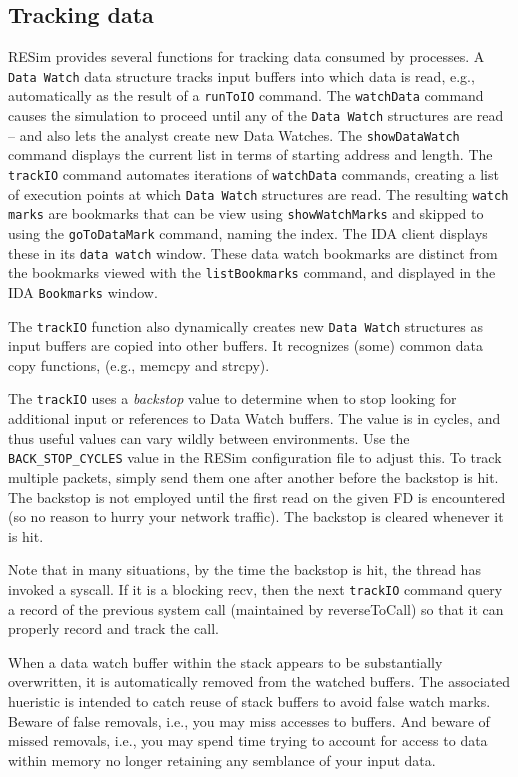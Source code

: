\documentclass[titlepage]{article}
\begin{document}
\subsection{Tracking data}
\label{tracking}
RESim provides several functions for tracking data consumed by processes.  A {\tt Data Watch} data structure tracks input buffers into which
data is read, e.g., automatically as the result of a {\tt runToIO} command.  The {\tt watchData} command causes the simulation to proceed until any of the
{\tt Data Watch} structures are read -- and also lets the analyst create new Data Watches. The {\tt showDataWatch} command displays the current list in
terms of starting address and length. 
The {\tt trackIO} command automates iterations of {\tt watchData} commands, creating a list of execution
points at which {\tt Data Watch} structures are read. The resulting {\tt watch marks} are bookmarks that can be view using {\tt showWatchMarks} and
skipped to using the {\tt goToDataMark} command, naming the index.   
The IDA client displays these in its {\tt data watch} window.
These data watch bookmarks are distinct from the bookmarks viewed with the {\tt listBookmarks} command, and displayed in the IDA {\tt Bookmarks} window.

The {\tt trackIO} function also dynamically creates new {\tt Data Watch} structures as input buffers are copied into other buffers.  It recognizes (some) common
data copy functions, (e.g., memcpy and strcpy). 

The {\tt trackIO} uses a \textit{backstop} value to determine when to stop looking for additional input or references to Data Watch buffers.  The value is in 
cycles, and thus useful values can vary wildly between environments.  Use the {\tt BACK\_STOP\_CYCLES} value in the RESim configuration file to adjust this.
To track multiple packets, simply send them one after another before the backstop is hit.  The backstop is not employed until the first read on the given
FD is encountered (so no reason to hurry your network traffic).  The backstop is cleared whenever it is hit. 

Note that in many situations, by the time the backstop is hit, the thread has invoked a syscall.  If it is a blocking recv, then the next {\tt trackIO} 
command query a record of the previous system call (maintained by reverseToCall) so that it can properly record and track the call.

When a data watch buffer within the stack appears to be substantially overwritten, it is automatically removed from the watched buffers.
The associated hueristic is intended to catch reuse of stack buffers to avoid false watch marks.  Beware of false removals, i.e., you
may miss accesses to buffers.  And beware of missed removals, i.e., you may spend time trying to account for access to data within memory
no longer retaining any semblance of your input data.
\end{document}
